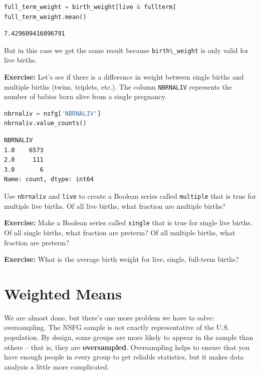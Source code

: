 \documentclass[
]{book}
\newcommand{\passthrough}[1]{#1}
\begin{document}
\begin{lstlisting}[language=Python]
full_term_weight = birth_weight[live & fullterm]
full_term_weight.mean()
\end{lstlisting}

\begin{lstlisting}
7.429609416096791
\end{lstlisting}

But in this case we get the same result because
\passthrough{\lstinline!birth\_weight!} is only valid for live births.

\textbf{Exercise:} Let's see if there is a difference in weight between
single births and multiple births (twins, triplets, etc.). The column
\passthrough{\lstinline!NBRNALIV!} represents the number of babies born
alive from a single pregnancy.

\begin{lstlisting}[language=Python]
nbrnaliv = nsfg['NBRNALIV']
nbrnaliv.value_counts()
\end{lstlisting}

\begin{lstlisting}
NBRNALIV
1.0    6573
2.0     111
3.0       6
Name: count, dtype: int64
\end{lstlisting}

Use \passthrough{\lstinline!nbrnaliv!} and
\passthrough{\lstinline!live!} to create a Boolean series called
\passthrough{\lstinline!multiple!} that is true for multiple live
births. Of all live births, what fraction are multiple births?

\textbf{Exercise:} Make a Boolean series called
\passthrough{\lstinline!single!} that is true for single live births. Of
all single births, what fraction are preterm? Of all multiple births,
what fraction are preterm?

\textbf{Exercise:} What is the average birth weight for live, single,
full-term births?

\section{Weighted Means}\label{weighted-means}

We are almost done, but there's one more problem we have to solve:
oversampling. The NSFG sample is not exactly representative of the U.S.
population. By design, some groups are more likely to appear in the
sample than others -- that is, they are \textbf{oversampled}.
Oversampling helps to ensure that you have enough people in every group
to get reliable statistics, but it makes data analysis a little more
complicated.
\end{document}
